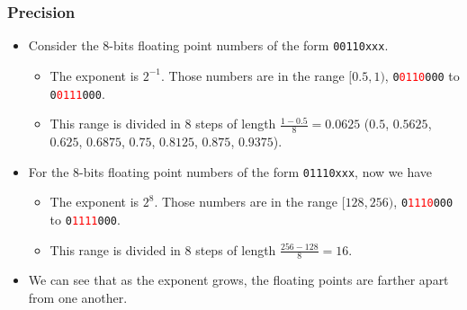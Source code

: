 \documentclass{beamer}
\begin{document}
\begin{frame}%
\frametitle{Precision}

\scriptsize

\begin{itemize}

\item Consider the $8$-bits floating point numbers of the form \texttt{00110xxx}.
  \begin{itemize}
    \scriptsize
  \item The exponent is $2^{-1}$. Those numbers are in the range $[0.5, 1)$, \texttt{0\textcolor{red}{0110}000}
    to \texttt{0\textcolor{red}{0111}000}.
  \item This range is divided in $8$ steps of length $\frac{1 - 0.5}{8} = 0.0625$
    ($0.5$, $0.5625$, $0.625$, $0.6875$, $0.75$, $0.8125$, $0.875$, $0.9375$).
  \end{itemize}

\vspace{0.3cm}

\item For the $8$-bits floating point numbers of the form \texttt{01110xxx}, now we have
  \begin{itemize}
    \scriptsize
  \item The exponent is $2^{8}$. Those numbers are in the range $[128, 256)$, \texttt{0\textcolor{red}{1110}000}
    to \texttt{0\textcolor{red}{1111}000}.
  \item This range is divided in $8$ steps of length $\frac{256 - 128}{8} = 16$.
  \end{itemize}

  \vspace{0.3cm}

\item We can see that as the exponent grows, the floating points are farther apart from one another.

\end{itemize}


\end{frame}

\lstset{language=Python}
\end{document}
